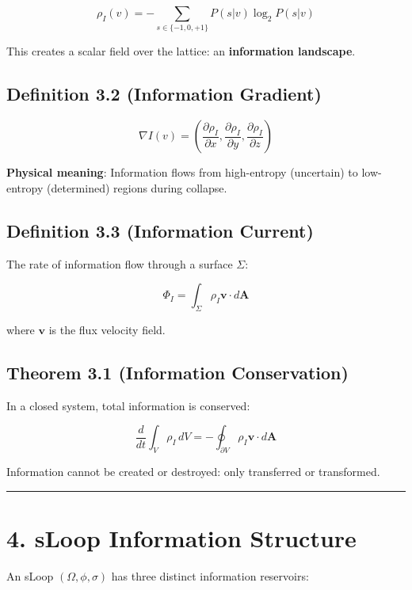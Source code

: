 \documentclass[
  11pt,
  letterpaper,
  twoside,
  openright]{book}
\begin{document}
\[\rho_I(v) = -\sum_{s \in \{-1,0,+1\}} P(s|v) \log_2 P(s|v)\]

This creates a scalar field over the lattice: an \textbf{information
landscape}.

\subsection{Definition 3.2 (Information
Gradient)}\label{definition-3.2-information-gradient}

\[\nabla I(v) = \left(\frac{\partial \rho_I}{\partial x}, \frac{\partial \rho_I}{\partial y}, \frac{\partial \rho_I}{\partial z}\right)\]

\textbf{Physical meaning}: Information flows from high-entropy
(uncertain) to low-entropy (determined) regions during collapse.

\subsection{Definition 3.3 (Information
Current)}\label{definition-3.3-information-current}

The rate of information flow through a surface \(\Sigma\):

\[\Phi_I = \int_\Sigma \rho_I \mathbf{v} \cdot d\mathbf{A}\]

where \(\mathbf{v}\) is the flux velocity field.

\subsection{Theorem 3.1 (Information
Conservation)}\label{theorem-3.1-information-conservation}

In a closed system, total information is conserved:

\[\frac{d}{dt} \int_V \rho_I \, dV = -\oint_{\partial V} \rho_I \mathbf{v} \cdot d\mathbf{A}\]

Information cannot be created or destroyed: only transferred or
transformed.

\begin{center}\rule{0.5\linewidth}{0.5pt}\end{center}

\section{4. sLoop Information
Structure}\label{sloop-information-structure}

An sLoop \((\Omega, \phi, \sigma)\) has three distinct information
reservoirs:
\end{document}
